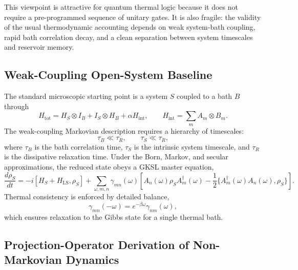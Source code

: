 \documentclass[11pt]{article}
\begin{document}
This viewpoint is attractive for quantum thermal logic because it does not require a
pre-programmed sequence of unitary gates.  It is also fragile: the validity of the usual
thermodynamic accounting depends on weak system-bath coupling, rapid bath correlation
decay, and a clean separation between system timescales and reservoir memory.

\subsection{Weak-Coupling Open-System Baseline}

The standard microscopic starting point is a system $S$ coupled to a bath $B$ through
\begin{equation}
    H_{\mathrm{tot}}
    =
    H_S\otimes I_B + I_S\otimes H_B + \alpha H_{\mathrm{int}},
    \qquad
    H_{\mathrm{int}}=\sum_m A_m\otimes B_m .
\end{equation}
The weak-coupling Markovian description requires a hierarchy of timescales:
\begin{equation}
    \tau_B \ll \tau_R,
    \qquad
    \tau_S \ll \tau_R ,
\end{equation}
where $\tau_B$ is the bath correlation time, $\tau_S$ is the intrinsic system timescale, and
$\tau_R$ is the dissipative relaxation time.  Under the Born, Markov, and secular
approximations, the reduced state obeys a GKSL master equation,
\begin{equation}
    \frac{d\rho_S}{dt}
    =
    -i[H_S+H_{\mathrm{LS}},\rho_S]
    +
    \sum_{\omega,m,n}
    \gamma_{mn}(\omega)
    \left[
        A_n(\omega)\rho_S A_m^\dagger(\omega)
        -
        \frac{1}{2}
        \{A_m^\dagger(\omega)A_n(\omega),\rho_S\}
    \right].
    \label{eq:gksl}
\end{equation}
Thermal consistency is enforced by detailed balance,
\begin{equation}
    \gamma_{mn}(-\omega)
    =
    e^{-\beta\omega}\gamma_{nm}(\omega),
\end{equation}
which ensures relaxation to the Gibbs state for a single thermal bath.

\subsection{Projection-Operator Derivation of Non-Markovian Dynamics}
\end{document}
